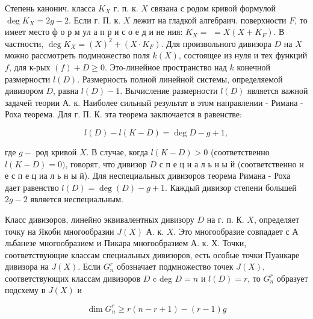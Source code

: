 \documentclass[10pt]{article}
\begin{document}
Степень канонич. класса $K_{X}$ г. п. к. $X$ связана с родом кривой формулой $\operatorname{deg} K_{X}=2 g-2$. Если г. П. к. $X$ лежит на гладкой алгебраич. поверхности $F$, то имеет место ф о р м ул а п р и с о е д и не ния: $K_{X}=$ $=X\left(X+K_{F}\right)$. В частности, $\operatorname{deg} K_{X}=(X)^{2}+\left(X \cdot K_{F}\right)$. Для произвольного дивизора $D$ на $X$ можно рассмотреть подмножество поля $k(X)$, состоящее из нуля и тех функций $f$, для к-рых $(f)+D \geqslant 0$. Это-линейное пространство над $k$ конечной размерности $l(D)$. Размерность полной линейной системы, определяемой дивизором $D$, равна $l(D)-1$. Вычисление размерности $l(D)$ является важной задачей теории А. к. Наиболее сильный результат в этом направлении - Римана - Роха теорема. Для г. П. К. эта теорема заключается в равенстве:



\[

l(D)-l(K-D)=\operatorname{deg} D-g+1,

\]



где $g-$ род кривой $X$. В случае, когда $l(K-D)>0$ (соответственно $l(K-D)=0)$, говорят, что дивизор $D$ с п е ц и а л ь н ы й (соответственно н е с п е ц иа л ь н ы й). Для неспециальных дивизоров теорема Римана - Роха дает равенство $l(D)=\operatorname{deg}(D)-g+1$. Каждый дивизор степени большей $2 g-2$ является неспециальным.



Класс дивизоров, линейно эквивалентных дивизору $D$ на г. п. К. $X$, определяет точку на Якоби многообразии $J(X)$ А. к. $X$. Это многообразие совпадает с $А$ льбанезе многообразием и Пикара многообразием А. к. Х. Точки, соответствующие классам специальных дивизоров, есть особые точки Пуанкаре дивизора на $J(X)$. Если $G_{n}^{r}$ обозначает подмножество точек $J(X)$, соответствующих классам дивизоров $D$ c deg $D=n$ и $l(D)=r$, то $G_{n}^{r}$ образует подсхему в $J(X)$ и



\[

\operatorname{dim} G_{n}^{r} \geqslant r(n-r+1)-(r-1) g

\]
\end{document}
